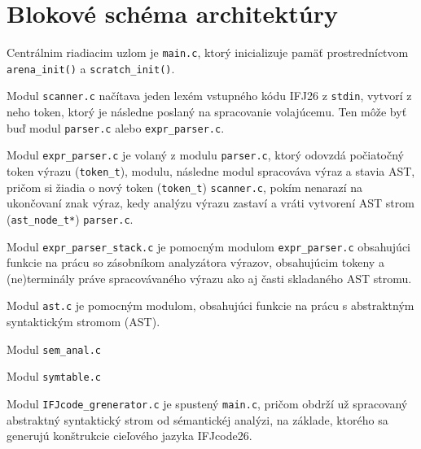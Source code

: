 \section{Blokové schéma architektúry}

\vspace{1.5em}
{ \large 
Centrálnim riadiacim uzlom je \verb|main.c|, ktorý inicializuje pamäť prostredníctvom \verb|arena_init()| a \verb|scratch_init()|.

Modul \verb|scanner.c| načítava jeden lexém vstupného kódu IFJ26 z \verb|stdin|, vytvorí z neho token, ktorý je následne poslaný na spracovanie volajúcemu. Ten môže byť buď modul \verb|parser.c| alebo \verb|expr_parser.c|. 

Modul \verb|expr_parser.c| je volaný z modulu \verb|parser.c|, ktorý odovzdá počiatočný token výrazu (\verb|token_t|), modulu, následne modul spracováva výraz a stavia AST, pričom si žiadia o nový token (\verb|token_t|) \verb|scanner.c|, pokím nenarazí na ukončovaní znak výraz, kedy analýzu výrazu zastaví a vráti vytvorení AST strom (\verb|ast_node_t*|) \verb|parser.c|.

Modul \verb|expr_parser_stack.c| je pomocným modulom \verb|expr_parser.c| obsahujúci funkcie na prácu so zásobníkom analyzátora výrazov, obsahujúcim tokeny a (ne)terminály práve spracovávaného výrazu ako aj časti skladaného AST stromu.

Modul \verb|ast.c| je pomocným modulom, obsahujúci funkcie na prácu s abstraktným syntaktickým stromom (AST).

Modul \verb|sem_anal.c|

Modul \verb|symtable.c|

Modul \verb|IFJcode_grenerator.c| je spustený \verb|main.c|, pričom obdrží už spracovaný abstraktný syntaktický strom od sémantickéj analýzi, na základe, ktorého sa generujú konštrukcie cieľového jazyka IFJcode26.
}